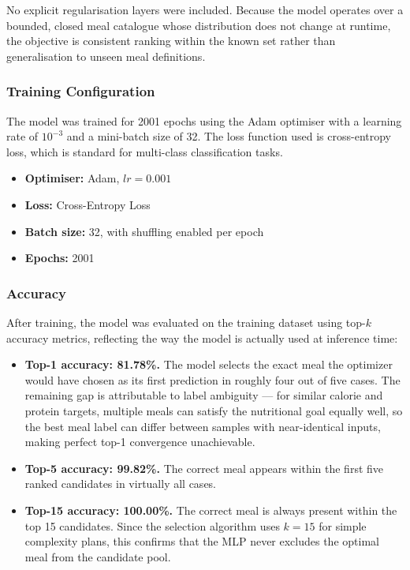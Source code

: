 No explicit regularisation layers were included. Because the model operates over a
bounded, closed meal catalogue whose distribution does not change at runtime, the
objective is consistent ranking within the known set rather than generalisation to
unseen meal definitions.

\subsubsection{Training Configuration}

The model was trained for 2001 epochs using the Adam optimiser with a learning rate of
$10^{-3}$ and a mini-batch size of 32. The loss function used is cross-entropy loss,
which is standard for multi-class classification tasks.

\begin{itemize}
    \item \textbf{Optimiser:} Adam, $lr = 0.001$
    \item \textbf{Loss:} Cross-Entropy Loss
    \item \textbf{Batch size:} 32, with shuffling enabled per epoch
    \item \textbf{Epochs:} 2001
\end{itemize}

\subsubsection{Accuracy}

After training, the model was evaluated on the training dataset using top-$k$ accuracy
metrics, reflecting the way the model is actually used at inference time:

\begin{itemize}
    \item \textbf{Top-1 accuracy: 81.78\%.} The model selects the exact meal the
    optimizer would have chosen as its first prediction in roughly four out of five
    cases. The remaining gap is attributable to label ambiguity — for similar
    calorie and protein targets, multiple meals can satisfy the nutritional goal
    equally well, so the best meal label can differ between samples with
    near-identical inputs, making perfect top-1 convergence unachievable.
    \item \textbf{Top-5 accuracy: 99.82\%.} The correct meal appears within the
    first five ranked candidates in virtually all cases.
    \item \textbf{Top-15 accuracy: 100.00\%.} The correct meal is always present
    within the top 15 candidates. Since the selection algorithm uses $k = 15$ for
    simple complexity plans, this confirms that the MLP never excludes the optimal
    meal from the candidate pool.
\end{itemize}

